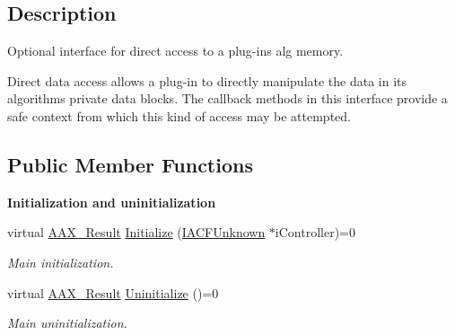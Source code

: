 \subsection{Description}
Optional interface for direct access to a plug-\/in\textquotesingle{}s alg memory. 

Direct data access allows a plug-\/in to directly manipulate the data in its algorithm\textquotesingle{}s private data blocks. The callback methods in this interface provide a safe context from which this kind of access may be attempted. \subsection*{Public Member Functions}
\begin{Indent}{\bf Initialization and uninitialization}\par
\begin{DoxyCompactItemize}
\item 
virtual \hyperlink{a00149_a4d8f69a697df7f70c3a8e9b8ee130d2f}{A\+A\+X\+\_\+\+Result} \hyperlink{a00059_adefbc617c71ea5ea6512fb79a116dbf7}{Initialize} (\hyperlink{a00146}{I\+A\+C\+F\+Unknown} $\ast$i\+Controller)=0
\begin{DoxyCompactList}\small\item\em Main initialization. \end{DoxyCompactList}\item 
virtual \hyperlink{a00149_a4d8f69a697df7f70c3a8e9b8ee130d2f}{A\+A\+X\+\_\+\+Result} \hyperlink{a00059_ad56406a13dd691db6f1117ab97cfc90a}{Uninitialize} ()=0
\begin{DoxyCompactList}\small\item\em Main uninitialization. \end{DoxyCompactList}\end{DoxyCompactItemize}
\end{Indent}
